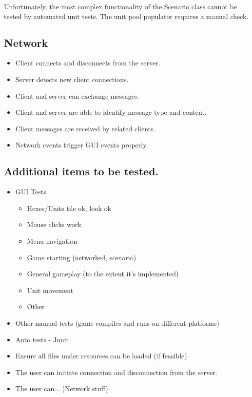 {Unfortunately, the most complex functionality of the Scenario class 
cannot be tested by automated unit tests. The unit pool populator requires 
a manual check.

\subsection{Network}
\begin{itemize}
  \item Client connects and disconnects from the server.
  \item Server detects new client connections.
  \item Client and server can exchange messages.
  \item Client and server are able to identify message type and content.
  \item Client messages are received by related clients.
  \item Network events trigger GUI events properly.
\end{itemize}

\subsection	{Additional items to be tested.}

{\color{black}
\begin{itemize}
\item GUI Tests
\begin{itemize}
\item Hexes/Units tile ok, look ok
\item Mouse clicks work
\item Menu navigation
\item Game starting (networked, scenario)
\item General gameplay (to the extent it's implemented)
\item Unit movement
\item Other
\end{itemize}
\item Other manual tests (game compiles and runs on different platforms)
\item Auto tests - Junit
\item Ensure all files under resources can be loaded (if feasible)
\item The user can initiate connection and disconnection from the server.
\item The user can... (Network stuff)
\end{itemize}
}

}
